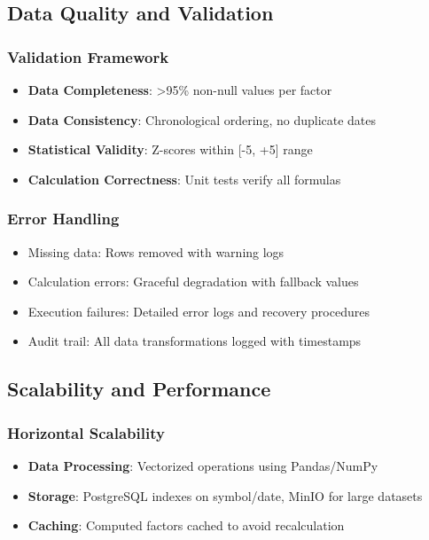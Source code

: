 \documentclass[11pt, a4paper, twoside]{article}
\begin{document}
\subsection{Data Quality and Validation}

\subsubsection{Validation Framework}

\begin{itemize}
    \item \textbf{Data Completeness}: >95\% non-null values per factor
    \item \textbf{Data Consistency}: Chronological ordering, no duplicate dates
    \item \textbf{Statistical Validity}: Z-scores within [-5, +5] range
    \item \textbf{Calculation Correctness}: Unit tests verify all formulas
\end{itemize}

\subsubsection{Error Handling}

\begin{itemize}
    \item Missing data: Rows removed with warning logs
    \item Calculation errors: Graceful degradation with fallback values
    \item Execution failures: Detailed error logs and recovery procedures
    \item Audit trail: All data transformations logged with timestamps
\end{itemize}

\subsection{Scalability and Performance}

\subsubsection{Horizontal Scalability}

\begin{itemize}
    \item \textbf{Data Processing}: Vectorized operations using Pandas/NumPy
    \item \textbf{Storage}: PostgreSQL indexes on symbol/date, MinIO for large datasets
    \item \textbf{Caching}: Computed factors cached to avoid recalculation
\end{itemize}
\end{document}
